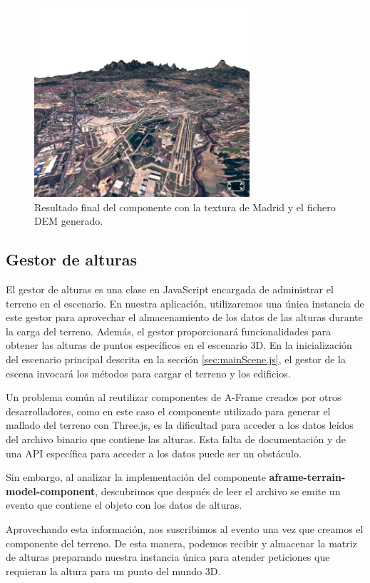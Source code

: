 \documentclass[a4paper, 11pt]{book}
\begin{document}
\begin{figure}[H]
  \centering
  \includegraphics[width=8cm, keepaspectratio]{img/madrid_terrain.jpg}
  \caption{Resultado final del componente con la textura de Madrid y el fichero DEM generado.}
  \label{fig:demAframe}
\end{figure}

\subsection{Gestor de alturas}
\label{subsec:heightManager}
El gestor de alturas es una clase en JavaScript encargada de administrar el terreno en el escenario. En nuestra aplicación, utilizaremos una única instancia de este gestor para aprovechar el almacenamiento de los datos de las alturas durante la carga del terreno. Además, el gestor proporcionará funcionalidades para obtener las alturas de puntos específicos en el escenario 3D. En la inicialización del escenario principal descrita en la sección \ref{sec:mainScene.js}, el gestor de la escena invocará los métodos para cargar el terreno y los edificios.

Un problema común al reutilizar componentes de A-Frame creados por otros desarrolladores, como en este caso el componente utilizado para generar el mallado del terreno con Three.js, es la dificultad para acceder a los datos leídos del archivo binario que contiene las alturas. Esta falta de documentación y de una API específica para acceder a los datos puede ser un obstáculo.

Sin embargo, al analizar la implementación del componente\textbf{ aframe-terrain-model-component}, descubrimos que después de leer el archivo se emite un evento que contiene el objeto con los datos de alturas.

Aprovechando esta información, nos suscribimos al evento una vez que creamos el componente del terreno. De esta manera, podemos recibir y almacenar la matriz de alturas preparando nuestra instancia única para atender peticiones que requieran la altura para un punto del mundo 3D.
\end{document}
